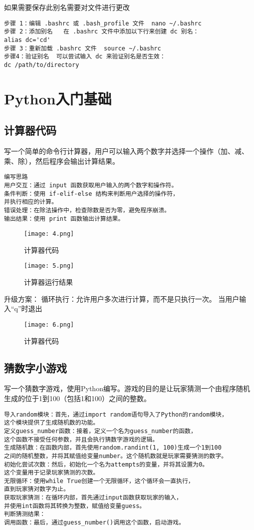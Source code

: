 \documentclass[a4paper, 12pt]{article}
\begin{document}
如果需要保存此别名需要对文件进行更改
\begin{lstlisting}
步骤 1：编辑 .bashrc 或 .bash_profile 文件  nano ~/.bashrc
步骤 2：添加别名   在 .bashrc 文件中添加以下行来创建 dc 别名：
alias dc='cd'
步骤 3：重新加载 .bashrc 文件  source ~/.bashrc
步骤4：验证别名  可以尝试输入 dc 来验证别名是否生效：
dc /path/to/directory
\end{lstlisting}

\section{Python入门基础}
\subsection{计算器代码}  
写一个简单的命令行计算器，用户可以输入两个数字并选择一个操作（加、减、乘、除），然后程序会输出计算结果。


\begin{lstlisting}
编写思路
用户交互：通过 input 函数获取用户输入的两个数字和操作符。
条件判断：使用 if-elif-else 结构来判断用户选择的操作符，
并执行相应的计算。
错误处理：在除法操作中，检查除数是否为零，避免程序崩溃。
输出结果：使用 print 函数输出计算结果。
\end{lstlisting}

\begin{figure}[H]
  \centering
    \texttt{[image: 4.png]}
  \caption{计算器代码}
   \end{figure}

   \begin{figure}[H]
  \centering
    \texttt{[image: 5.png]}
  \caption{计算器运行结果}
   \end{figure}
升级方案：
循环执行：允许用户多次进行计算，而不是只执行一次。
当用户输入“q”时退出
\begin{figure}[H]
  \centering
    \texttt{[image: 6.png]}
  \caption{计算器代码}
   \end{figure}
   
  \subsection{猜数字小游戏}  
  写一个猜数字游戏，使用Python编写。游戏的目的是让玩家猜测一个由程序随机生成的位于1到100（包括1和100）之间的整数。
\begin{lstlisting}
导入random模块：首先，通过import random语句导入了Python的random模块，
这个模块提供了生成随机数的功能。
定义guess_number函数：接着，定义一个名为guess_number的函数，
这个函数不接受任何参数，并且会执行猜数字游戏的逻辑。
生成随机数：在函数内部，首先使用random.randint(1, 100)生成一个1到100
之间的随机整数，并将其赋值给变量number。这个随机数就是玩家需要猜测的数字。
初始化尝试次数：然后，初始化一个名为attempts的变量，并将其设置为0。
这个变量用于记录玩家猜测的次数。
无限循环：使用while True创建一个无限循环，这个循环会一直执行，
直到玩家猜对数字为止。
获取玩家猜测：在循环内部，首先通过input函数获取玩家的输入，
并使用int函数将其转换为整数，赋值给变量guess。
判断猜测结果：
调用函数：最后，通过guess_number()调用这个函数，启动游戏。
\end{lstlisting}
\end{document}
